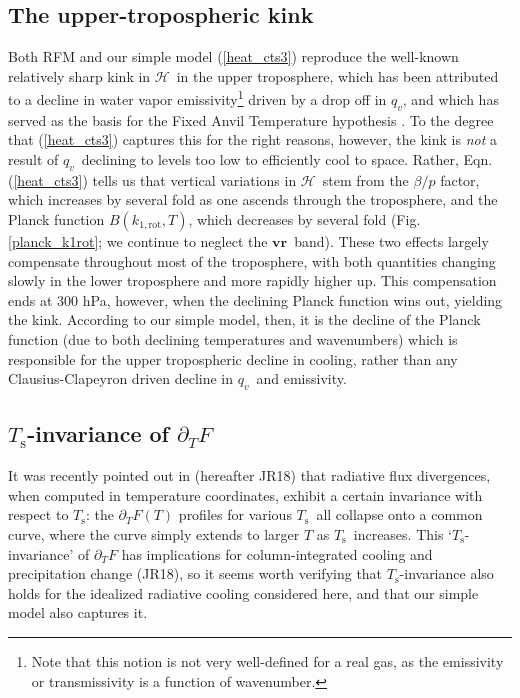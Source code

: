\documentclass{ametsoc}
\newcommand{\eqnref}[1]{(\ref{#1})}
\newcommand{\ppt}{\ensuremath{\partial_T}}
\newcommand{\qv}{\ensuremath{q_v}}
\newcommand{\Ts}{\ensuremath{T_\mathrm{s}}}
\newcommand{\ch}{\ensuremath{\mathcal{H}}}
\newcommand{\konerot}{\ensuremath{k_{1,\mathrm{rot}}}}
\newcommand{\vr}{\ensuremath{\mathbf{vr}}}
\begin{document}
\subsection{The upper-tropospheric kink} \label{sec_kink}
  Both RFM and  our simple model \eqnref{heat_cts3} reproduce the well-known relatively sharp kink in \ch\ in the upper troposphere, which has been attributed to a decline in water vapor emissivity\footnote{Note that this notion is not very well-defined for a real gas, as the emissivity or transmissivity is a function of wavenumber.} driven by a drop off in \qv, and which has served as the basis for the Fixed Anvil Temperature hypothesis \citep[FAT; e.g.][]{hartmann2002, hartmann2001}. To the degree that \eqnref{heat_cts3} captures this for the right reasons, however, the kink is \emph{not} a result of \qv\ declining to levels too low to efficiently cool to space. Rather, Eqn. \eqnref{heat_cts3} tells us that vertical variations in \ch\ stem from the $\beta/p$ factor, which increases by several fold as one ascends through the troposphere, and the Planck function $B(\konerot,T)$, which decreases by several fold (Fig. \ref{planck_k1rot}; we continue to neglect the \vr\ band). These two effects largely compensate throughout most of the troposphere, with both quantities changing  slowly in the lower troposphere and more rapidly higher up. This compensation ends at  300 hPa, however, when the declining Planck function wins out, yielding the kink. According to our simple model, then, it is the decline of the Planck function (due to both declining temperatures and wavenumbers) which is responsible for the upper tropospheric decline in cooling, rather than any Clausius-Clapeyron driven decline in \qv\ and emissivity.
  
\subsection{\Ts-invariance of $\ppt F$} \label{sec_Ts_invariance}
It was recently pointed out in \cite{jeevanjee2018} (hereafter JR18) that radiative flux divergences, when computed in temperature coordinates, exhibit a certain invariance with respect to \Ts: the $\ppt F(T)$ profiles for various \Ts\ all collapse onto a common curve, where the curve simply extends to larger $T$ as \Ts\ increases. This `\Ts-invariance' of $\ppt F$ has implications for column-integrated cooling and precipitation change (JR18), so it seems worth verifying that \Ts-invariance also holds for the idealized radiative cooling considered here, and that our simple model also captures it.
\end{document}
